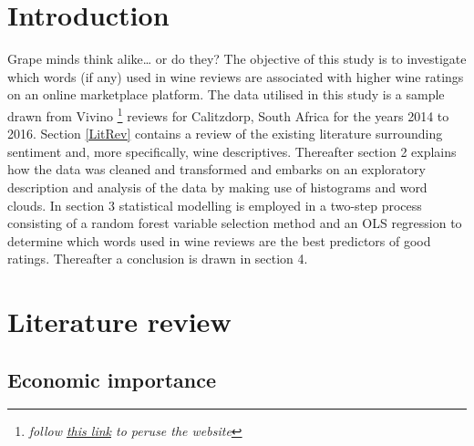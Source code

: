 \documentclass[11pt,preprint]{elsarticle}
\numberwithin{equation}{section}
\numberwithin{figure}{section}
\numberwithin{table}{section}
\let\rmarkdownfootnote\footnote%
\def\footnote{\protect\rmarkdownfootnote}
\begin{document}
\setcounter{footnote}{0}



\pagestyle{fancy}
\chead{}
\rhead{}
\lhead{\leftmark}
\cfoot{}


\headsep 35pt %




\newpage

\section{\texorpdfstring{Introduction
\label{Intro}}{Introduction }}\label{introduction}

Grape minds think alike\ldots{} or do they? The objective of this study
is to investigate which words (if any) used in wine reviews are
associated with higher wine ratings on an online marketplace platform.
The data utilised in this study is a sample drawn from Vivino
\footnote{\emph{follow \href{https://www.vivino.com/}{this link} to
  peruse the website}} reviews for Calitzdorp, South Africa for the
years 2014 to 2016. Section \ref{LitRev} contains a review of the
existing literature surrounding sentiment and, more specifically, wine
descriptives. Thereafter section 2 explains how the data was cleaned and
transformed and embarks on an exploratory description and analysis of
the data by making use of histograms and word clouds. In section 3
statistical modelling is employed in a two-step process consisting of a
random forest variable selection method and an OLS regression to
determine which words used in wine reviews are the best predictors of
good ratings. Thereafter a conclusion is drawn in section 4.

\newpage

\section{\texorpdfstring{Literature review
\label{LitRev}}{Literature review }}\label{literature-review}

\subsection{Economic importance}\label{economic-importance}
\end{document}
